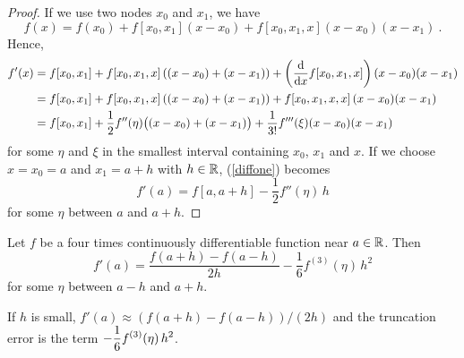 \begin{proof}
If we use two nodes $x_0$ and $x_1$, we have
\[
f(x) = f(x_0) + f[x_0,x_1](x-x_0) + f[x_0,x_1,x](x-x_0)(x-x_1) \ .
\]
Hence,
\begin{align}
f'(x) &= f[x_0,x_1] + f[x_0,x_1,x]\left((x-x_0)+(x-x_1)\right)
+ \left( \dfdx{f[x_0,x_1,x]}{x}\right)(x-x_0)(x-x_1) \nonumber \\
&= f[x_0,x_1] + f[x_0,x_1,x]\left((x-x_0)+(x-x_1)\right)
+ f[x_0,x_1,x,x] \,(x-x_0)(x-x_1) \nonumber \\
&= f[x_0,x_1] + \frac{1}{2}f''(\eta)\big((x-x_0)+(x-x_1)\big) +
\frac{1}{3!}f'''(\xi)(x-x_0)(x-x_1) \label{diffone}
\end{align}
for some $\eta$ and $\xi$ in the smallest interval containing $x_0$,
$x_1$ and $x$.  If we choose $x = x_0 = a$ and $x_1= a + h$ with
$h \in \RR$, (\ref{diffone}) becomes
\[
f'(a) = f[a,a+h] - \frac{1}{2}f''(\eta)\,h
\]
for some $\eta$ between $a$ and $a+h$.
\end{proof}

\begin{theorem}
Let $f$ be a four times continuously differentiable function near
$a \in \RR$.  Then
\begin{equation} \label{CDF}
f'(a) = \frac{f(a + h) - f(a - h)}{2h} - \frac{1}{6}f^{(3)}(\eta)\,h^2
\end{equation}
for some $\eta$ between $a-h$ and $a+h$.
\end{theorem}

\begin{rmk}
If $h$ is small, $f'(a) \approx (f(a + h) - f(a - h))/(2h)$ and the 
truncation error is the term $\DS -\frac{1}{6}f^{(3)}(\eta)\,h^2$.
\end{rmk}

